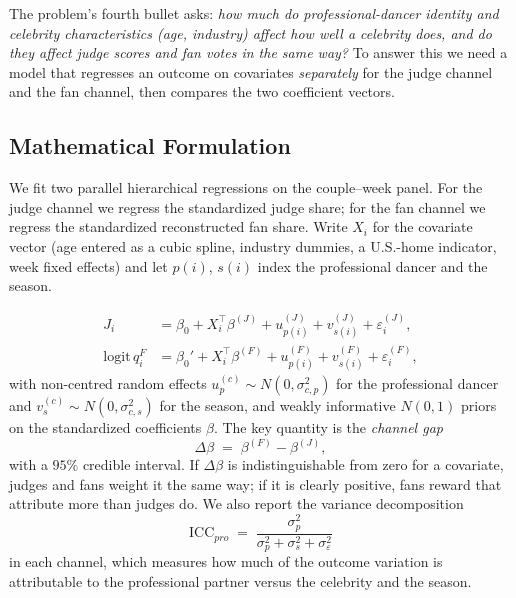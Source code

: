 \documentclass{article}
\begin{document}
The problem's fourth bullet asks: \emph{how much do professional-dancer identity and
celebrity characteristics (age, industry) affect how well a celebrity does, and do they
affect judge scores and fan votes in the same way?} To answer this we need a model that
regresses an outcome on covariates \emph{separately} for the judge channel and the fan
channel, then compares the two coefficient vectors.

\subsection{Mathematical Formulation}

We fit two parallel hierarchical regressions on the couple--week panel. For the judge
channel we regress the standardized judge share; for the fan channel we regress the
standardized reconstructed fan share. Write $X_i$ for the covariate vector (age entered as
a cubic spline, industry dummies, a U.S.-home indicator, week fixed effects) and let
$p(i)$, $s(i)$ index the professional dancer and the season.

\begin{align}
J_{i} &= \beta_0 + X_i^{\top}\beta^{(J)} + u^{(J)}_{p(i)} + v^{(J)}_{s(i)} + \varepsilon^{(J)}_i, \label{eq:jchan}\\
\mathrm{logit}\,q^{F}_{i} &= \beta_0' + X_i^{\top}\beta^{(F)} + u^{(F)}_{p(i)} + v^{(F)}_{s(i)} + \varepsilon^{(F)}_i, \label{eq:fchan}
\end{align}
with non-centred random effects
$u^{(c)}_{p}\sim N(0,\sigma^2_{c,p})$ for the professional dancer and
$v^{(c)}_{s}\sim N(0,\sigma^2_{c,s})$ for the season, and weakly informative $N(0,1)$
priors on the standardized coefficients $\beta$. The key quantity is the
\emph{channel gap}
\begin{equation}
\Delta\beta \;=\; \beta^{(F)} - \beta^{(J)},
\end{equation}
with a $95\%$ credible interval. If $\Delta\beta$ is indistinguishable from zero for a
covariate, judges and fans weight it the same way; if it is clearly positive, fans reward
that attribute more than judges do. We also report the variance decomposition
\begin{equation}
\mathrm{ICC}_{pro} \;=\; \frac{\sigma^2_{p}}{\sigma^2_{p}+\sigma^2_{s}+\sigma^2_{\varepsilon}}
\end{equation}
in each channel, which measures how much of the outcome variation is attributable to the
professional partner versus the celebrity and the season.
\end{document}
